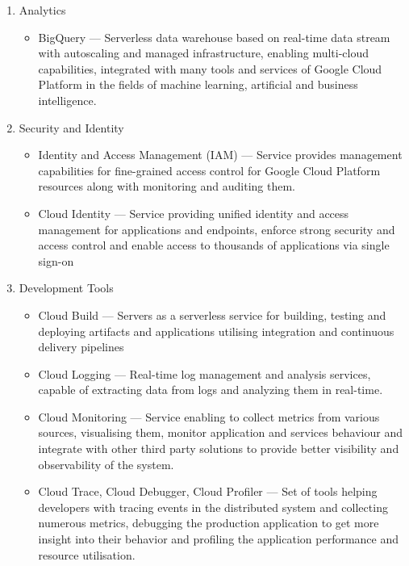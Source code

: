 \begin{enumerate}
\begin{itemize}
   \end{itemize}
   \item Analytics
   \begin{itemize}
       \item BigQuery --- Serverless data warehouse based on real-time data stream with autoscaling and managed infrastructure, enabling multi-cloud capabilities, integrated with many tools and services of Google Cloud Platform in the fields of machine learning, artificial and business intelligence.
   \end{itemize}
   \item Security and Identity
   \begin{itemize}
       \item Identity and Access Management (IAM) --- Service provides management capabilities for fine-grained access control for Google Cloud Platform resources along with monitoring and auditing them.
       \item Cloud Identity --- Service providing unified identity and access management for applications and endpoints, enforce strong security and access control and enable access to thousands of applications via single sign-on
   \end{itemize}
   \item Development Tools
   \begin{itemize}
       \item Cloud Build --- Servers as a serverless service for building, testing and deploying artifacts and applications utilising integration and continuous delivery pipelines
       \item Cloud Logging --- Real-time log management and analysis services, capable of extracting data from logs and analyzing them in real-time.
       \item Cloud Monitoring --- Service enabling to collect metrics from various sources, visualising them, monitor application and services behaviour and integrate with other third party solutions to provide better visibility and observability of the system.
       \item Cloud Trace, Cloud Debugger, Cloud Profiler --- Set of tools helping developers with tracing events in the distributed system and collecting numerous metrics, debugging the production application to get more insight into their behavior and profiling the application performance and resource utilisation.
   \end{itemize}
\end{enumerate}

